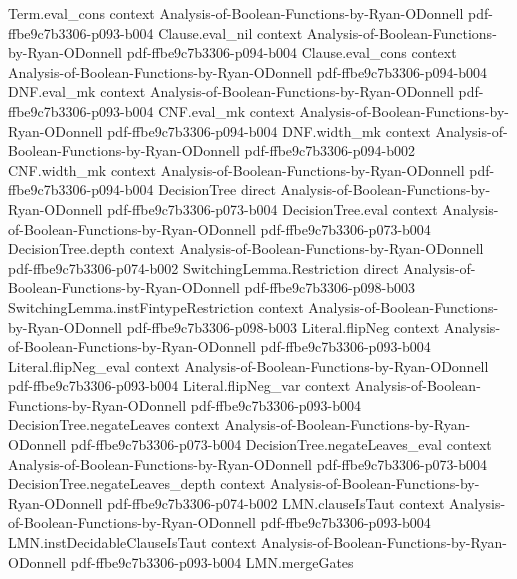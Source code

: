 \begin{theorem}
\proofstep
  {Term.eval_cons}
  {context}
  {Analysis-of-Boolean-Functions-by-Ryan-ODonnell}
  {pdf-ffbe9c7b3306-p093-b004}
\proofstep
  {Clause.eval_nil}
  {context}
  {Analysis-of-Boolean-Functions-by-Ryan-ODonnell}
  {pdf-ffbe9c7b3306-p094-b004}
\proofstep
  {Clause.eval_cons}
  {context}
  {Analysis-of-Boolean-Functions-by-Ryan-ODonnell}
  {pdf-ffbe9c7b3306-p094-b004}
\proofstep
  {DNF.eval_mk}
  {context}
  {Analysis-of-Boolean-Functions-by-Ryan-ODonnell}
  {pdf-ffbe9c7b3306-p093-b004}
\proofstep
  {CNF.eval_mk}
  {context}
  {Analysis-of-Boolean-Functions-by-Ryan-ODonnell}
  {pdf-ffbe9c7b3306-p094-b004}
\proofstep
  {DNF.width_mk}
  {context}
  {Analysis-of-Boolean-Functions-by-Ryan-ODonnell}
  {pdf-ffbe9c7b3306-p094-b002}
\proofstep
  {CNF.width_mk}
  {context}
  {Analysis-of-Boolean-Functions-by-Ryan-ODonnell}
  {pdf-ffbe9c7b3306-p094-b004}
\proofstep
  {DecisionTree}
  {direct}
  {Analysis-of-Boolean-Functions-by-Ryan-ODonnell}
  {pdf-ffbe9c7b3306-p073-b004}
\proofstep
  {DecisionTree.eval}
  {context}
  {Analysis-of-Boolean-Functions-by-Ryan-ODonnell}
  {pdf-ffbe9c7b3306-p073-b004}
\proofstep
  {DecisionTree.depth}
  {context}
  {Analysis-of-Boolean-Functions-by-Ryan-ODonnell}
  {pdf-ffbe9c7b3306-p074-b002}
\proofstep
  {SwitchingLemma.Restriction}
  {direct}
  {Analysis-of-Boolean-Functions-by-Ryan-ODonnell}
  {pdf-ffbe9c7b3306-p098-b003}
\proofstep
  {SwitchingLemma.instFintypeRestriction}
  {context}
  {Analysis-of-Boolean-Functions-by-Ryan-ODonnell}
  {pdf-ffbe9c7b3306-p098-b003}
\proofstep
  {Literal.flipNeg}
  {context}
  {Analysis-of-Boolean-Functions-by-Ryan-ODonnell}
  {pdf-ffbe9c7b3306-p093-b004}
\proofstep
  {Literal.flipNeg_eval}
  {context}
  {Analysis-of-Boolean-Functions-by-Ryan-ODonnell}
  {pdf-ffbe9c7b3306-p093-b004}
\proofstep
  {Literal.flipNeg_var}
  {context}
  {Analysis-of-Boolean-Functions-by-Ryan-ODonnell}
  {pdf-ffbe9c7b3306-p093-b004}
\proofstep
  {DecisionTree.negateLeaves}
  {context}
  {Analysis-of-Boolean-Functions-by-Ryan-ODonnell}
  {pdf-ffbe9c7b3306-p073-b004}
\proofstep
  {DecisionTree.negateLeaves_eval}
  {context}
  {Analysis-of-Boolean-Functions-by-Ryan-ODonnell}
  {pdf-ffbe9c7b3306-p073-b004}
\proofstep
  {DecisionTree.negateLeaves_depth}
  {context}
  {Analysis-of-Boolean-Functions-by-Ryan-ODonnell}
  {pdf-ffbe9c7b3306-p074-b002}
\proofstep
  {LMN.clauseIsTaut}
  {context}
  {Analysis-of-Boolean-Functions-by-Ryan-ODonnell}
  {pdf-ffbe9c7b3306-p093-b004}
\proofstep
  {LMN.instDecidableClauseIsTaut}
  {context}
  {Analysis-of-Boolean-Functions-by-Ryan-ODonnell}
  {pdf-ffbe9c7b3306-p093-b004}
\proofstep
  {LMN.mergeGates}

\end{theorem}

